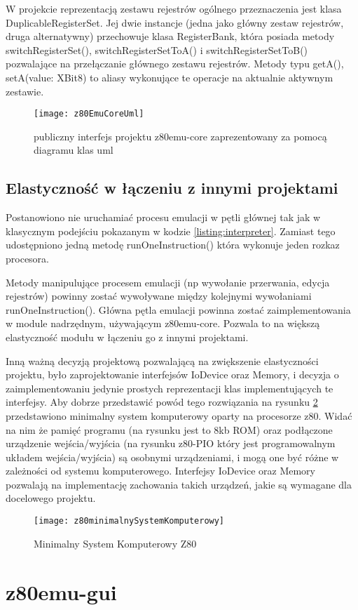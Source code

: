 	W projekcie reprezentacją zestawu rejestrów ogólnego przeznaczenia jest klasa DuplicableRegisterSet. Jej dwie instancje (jedna jako główny zestaw rejestrów, druga alternatywny) przechowuje klasa RegisterBank, która posiada metody switchRegisterSet(), switchRegisterSetToA() i switchRegisterSetToB() pozwalające na przełączanie głównego zestawu rejestrów. Metody typu getA(), setA(value: XBit8) to aliasy wykonujące te operacje na aktualnie aktywnym zestawie. 
	
		
	
	\begin{figure}[h]
		\centering
		\texttt{[image: z80EmuCoreUml]}
		\caption{publiczny interfejs projektu z80emu-core zaprezentowany za pomocą diagramu klas uml}
		\label{img:z80emuCoreUml}
	\end{figure}
	
	\subsection{Elastyczność w łączeniu z innymi projektami}
		
	Postanowiono nie uruchamiać procesu emulacji w pętli głównej tak jak w klasycznym podejściu pokazanym w kodzie \ref{listing:interpreter}. Zamiast tego udostępniono jedną metodę runOneInstruction() która wykonuje jeden rozkaz procesora.
	
	Metody manipulujące procesem emulacji (np wywołanie przerwania, edycja rejestrów) powinny zostać wywoływane między kolejnymi wywołaniami runOneInstruction(). Główna pętla emulacji powinna zostać zaimplementowania w module nadrzędnym, używającym z80emu-core. Pozwala to na większą elastyczność modułu w łączeniu go z innymi projektami.
	
	Inną ważną decyzją projektową pozwalającą na zwiększenie elastyczności projektu, było zaprojektowanie interfejsów IoDevice oraz Memory, i decyzja o zaimplementowaniu jedynie prostych reprezentacji klas implementujących te interfejsy. Aby dobrze przedstawić powód tego rozwiązania na rysunku \ref{img:z80minimalnySystemKomputerowy} przedstawiono minimalny system komputerowy oparty na procesorze z80.
	Widać na nim że pamięć programu (na rysunku jest to 8kb ROM) oraz podłączone urządzenie wejścia/wyjścia (na rysunku z80-PIO który jest programowalnym układem wejścia/wyjścia) są osobnymi urządzeniami, i mogą one być różne w zależności od systemu komputerowego. Interfejsy IoDevice oraz Memory pozwalają na implementację zachowania takich urządzeń, jakie są wymagane dla docelowego projektu. 
	
	
	\begin{figure}[h]
		\centering
		\texttt{[image: z80minimalnySystemKomputerowy]}
		\caption{Minimalny System Komputerowy Z80 \cite{eduinf}}
		\label{img:z80minimalnySystemKomputerowy}
	\end{figure}
		
	\section{z80emu-gui}
	
	